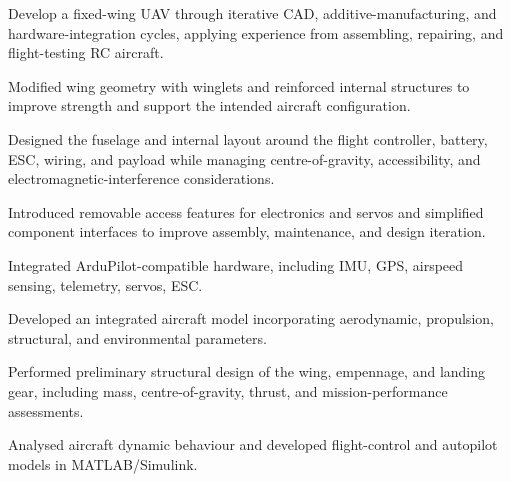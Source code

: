 {}

\begin{cvitems}
  \item Develop a fixed-wing UAV through iterative CAD, additive-manufacturing, and hardware-integration cycles, applying experience from assembling, repairing, and flight-testing RC aircraft.
  \item Modified wing geometry with winglets and reinforced internal structures to improve strength and support the intended aircraft configuration.
  \item Designed the fuselage and internal layout around the flight controller, battery, ESC, wiring, and payload while managing centre-of-gravity, accessibility, and electromagnetic-interference considerations.
  \item Introduced removable access features for electronics and servos and simplified component interfaces to improve assembly, maintenance, and design iteration.
  \item Integrated ArduPilot-compatible hardware, including IMU, GPS, airspeed sensing, telemetry, servos, ESC.
\end{cvitems}

\vspace{1em}
\begin{cvitems}
  \item Developed an integrated aircraft model incorporating aerodynamic, propulsion, structural, and environmental parameters.
  \item Performed preliminary structural design of the wing, empennage, and landing gear, including mass, centre-of-gravity, thrust, and mission-performance assessments.
  \item Analysed aircraft dynamic behaviour and developed flight-control and autopilot models in MATLAB/Simulink.
\end{cvitems}
